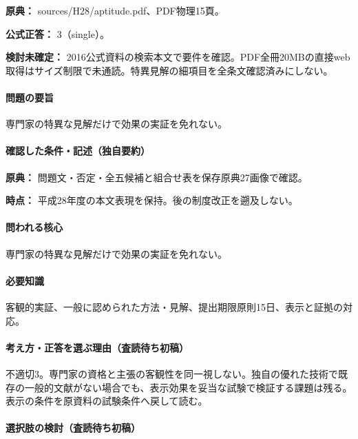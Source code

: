 \noindent\textbf{原典：} sources/H28/aptitude.pdf、PDF物理15頁。

\textbf{公式正答：} 3（single）。

\par\textbf{検討未確定：} 2016公式資料の検索本文で要件を確認。PDF全冊20MBの直接web取得はサイズ制限で未通読。特異見解の細項目を全条文確認済みにしない。

\paragraph{問題の要旨} 専門家の特異な見解だけで効果の実証を免れない。

\paragraph{確認した条件・記述（独自要約）}\mbox{}\par

\noindent\textbf{原典：} 問題文・否定・全五候補と組合せ表を保存原典27画像で確認。\par

\noindent\textbf{時点：} 平成28年度の本文表現を保持。後の制度改正を遡及しない。\par

\paragraph{問われる核心} 専門家の特異な見解だけで効果の実証を免れない。

\paragraph{必要知識} 客観的実証、一般に認められた方法・見解、提出期限原則15日、表示と証拠の対応。

\paragraph{考え方・正答を選ぶ理由（査読待ち初稿）} 不適切3。専門家の資格と主張の客観性を同一視しない。独自の優れた技術で既存の一般的文献がない場合でも、表示効果を妥当な試験で検証する課題は残る。表示の条件を原資料の試験条件へ戻して読む。

\paragraph{選択肢の検討（査読待ち初稿）}\mbox{}\par

